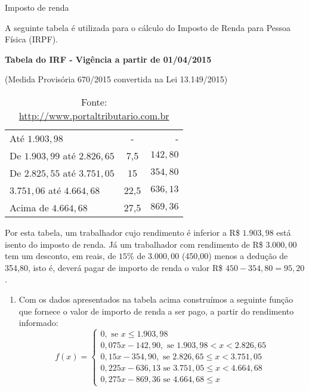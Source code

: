 \documentclass[extrafontsizes, twoside, 11pt, openright, final]{memoir}
\begin{document}
\begin{task}{Imposto de renda}

	A seguinte tabela é utilizada para o cálculo do Imposto de Renda para Pessoa Física (IRPF).

	\begin{table}[H]
		\centering

		\large{\textbf{Tabela do IRF - Vigência a partir de 01/04/2015}}

		(Medida Provisória 670/2015 convertida na Lei 13.149/2015)
		\begin{tabular}{|l|c|r|}
			\hline
			\hline
			\tcolor{Base de cálculo (R\$)}   & \tcolor{Alíquota (\%)} & \tcolor{Parcela a deduzir do IR (R\$)} \\
			\hline
			Até $1.903{,}98$                 & -                      & -                                      \\
			\hline
			De $1.903{,}99$ até $2.826{,}65$ & 7,5                    & $142{,}80$                             \\
			\hline
			De 2$.825{,}55$ até $3.751{,}05$ & 15                     & $354{,}80$                             \\
			\hline
			$3.751{,}06$ até $4.664{,}68$    & 22,5                   & $636{,}13$                             \\
			\hline
			Acima de $4.664{,}68$            & 27,5                   & $869{,}36$                             \\
			\hline
		\end{tabular}
		\caption{Fonte: \url{http://www.portaltributario.com.br}}
	\end{table}

	Por esta tabela, um trabalhador cujo rendimento é inferior a R\$ $1.903{,}98$ está isento do imposto de renda. Já um trabalhador com rendimento de R\$ $3.000{,}00$ tem um desconto, em reais, de $15\%$ de $3.000{,}00$ (450,00) menos a dedução de 354,80, isto é, deverá pagar de importo de renda o valor R\$ $450-354{,}80=95{,}20$ .

	\clearpage
	\begin{enumerate}
		\item Com os dados apresentados na tabela acima construímos a seguinte função que fornece o valor de importo de renda a ser pago, a partir do rendimento informado:
		      $$f(x)=
			      \begin{cases}
				      0, \text{ se } x\leq1.903{,}98                             \\
				      0{,}075x-142{,}90, \text{ se } 1.903{,}98<x<2.826{,}65     \\
				      0{,}15x-354{,}90, \text{ se } 2.826{,}65\leq x<3.751{,}05  \\
				      0{,}225x-636{,}13 \text{ se } 3.751{,}05 \leq x<4.664{,}68 \\
				      0{,}275x-869{,}36 \text{ se } 4.664{,}68\leq x
			      \end{cases}
		      $$


\end{enumerate}
\end{task}
\end{document}
